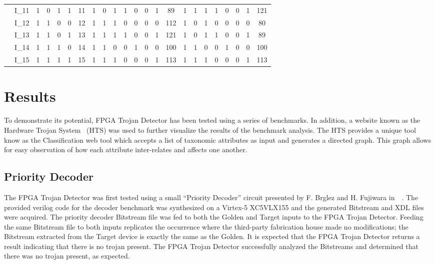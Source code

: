 \documentclass[journal, hidelinks]{IEEEtran}
\begin{document}
\begin{table}[t!]
\begin{tabular}{CC|C|C|C|C|C||C|C|C|C|C|C|C|C||C|C|C|C|C|C|C|C|}
		 & I_{11} & 1 & 0 & 1 & 1 & 11 & 1 & 0 & 1 & 1 & 0 & 0 & 1 & 89 & 1 & 1 & 1 & 1 & 0 & 0 & 1 & 121 \\ 
		 & I_{12} & 1 & 1 & 0 & 0 & 12 & 1 & 1 & 1 & 0 & 0 & 0 & 0 & 112 & 1 & 0 & 1 & 0 & 0 & 0 & 0 & 80 \\ 
		 & I_{13} & 1 & 1 & 0 & 1 & 13 & 1 & 1 & 1 & 1 & 0 & 0 & 1 & 121 & 1 & 0 & 1 & 1 & 0 & 0 & 1 & 89 \\ 
		 & I_{14} & 1 & 1 & 1 & 0 & 14 & 1 & 1 & 0 & 0 & 1 & 0 & 0 & 100 & 1 & 1 & 0 & 0 & 1 & 0 & 0 & 100 \\ 
		 & I_{15} & 1 & 1 & 1 & 1 & 15 & 1 & 1 & 1 & 0 & 0 & 0 & 1 & 113 & 1 & 1 & 1 & 0 & 0 & 0 & 1 & 113 \\ \hline
	\end{tabular}
\end{table}
\section{Results} \label{sec:results}
To demonstrate its potential, FPGA Trojan Detector has been tested using a series of benchmarks.
In addition, a website known as the Hardware Trojan System~\cite{meCategorization} (HTS) was used to further visualize the results of the benchmark analysis.
The HTS provides a unique tool know as the Classification web tool which accepts a list of taxonomic attributes as input and generates a directed graph.
This graph allows for easy observation of how each attribute inter-relates and affects one another.

\subsection{Priority Decoder} \label{sec:priorityDecoder}
The FPGA Trojan Detector was first tested using a small ``Priority Decoder'' circuit presented by F. Brglez and H. Fujiwara
in~~\cite{iscas85}.
The provided verilog code for the decoder benchmark was synthesized on a Virtex-5 XC5VLX155 and the generated Bitstream and XDL files were acquired.
The priority decoder Bitstream file was fed to both the Golden and Target inputs to the FPGA Trojan Detector.
Feeding the same Bitstream file to both inputs replicates the occurrence where the third-party fabrication house made no modifications; the Bitstream extracted from the Target device is exactly the same as the Golden.
It is expected that the FPGA Trojan Detector returns a result indicating that there is no trojan present.
The FPGA Trojan Detector successfully analyzed the Bitstreams and determined that there was no trojan present, as expected.
\end{document}
